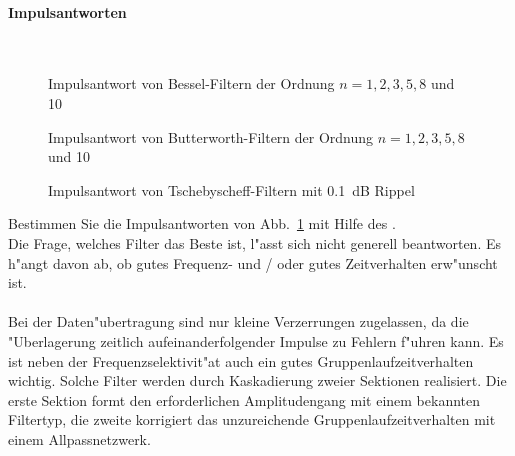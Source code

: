 \paragraph{Impulsantworten}~\\
\begin{figure}[!htb]
\vspace*{-3mm}
\begin{center}
  \caption{Impulsantwort von Bessel-Filtern der Ordnung $n=1,2,3,5,8$ und 10}
\end{center}
\vspace*{-6mm}
\end{figure}
\newpage
\begin{figure}[!!htbp]
\vspace*{-3mm}
\begin{center}
  \caption{Impulsantwort von Butterworth-Filtern der Ordnung $n=1,2,3,5,8$ und 10}
\end{center}
\vspace*{-6mm}
\end{figure}

\begin{figure}[!!htbp]
\vspace*{-3mm}
\begin{center}
  \caption{Impulsantwort von Tschebyscheff-Filtern mit 0.1~dB Rippel}\label{impuls_tscheby}
\end{center}
\vspace*{-6mm}
\end{figure}
\aufg
Bestimmen Sie die Impulsantworten von Abb.~\ref{impuls_tscheby} mit Hilfe des .\\
\newpage
\nit Die Frage, welches Filter das Beste ist, l"asst sich nicht generell
beantworten. Es h"angt davon ab, ob gutes Frequenz- und / oder gutes
Zeitverhalten erw"unscht ist.\\ ~\\ \nit Bei der Daten"ubertragung sind nur
kleine Verzerrungen zugelassen, da die "Uberlagerung zeitlich
aufeinanderfolgender Impulse zu Fehlern f"uhren kann. Es ist neben
der Frequenzselektivit"at auch ein gutes
Gruppenlaufzeitverhalten wichtig. Solche Filter
werden durch Kaskadierung zweier Sektionen realisiert. Die erste Sektion formt
den erforderlichen Amplitudengang mit einem bekannten Filtertyp, die
zweite korrigiert das unzureichende Gruppenlaufzeitverhalten mit einem Allpassnetzwerk.
